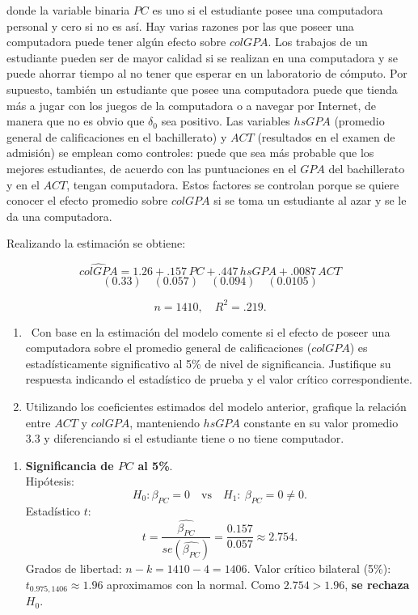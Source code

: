\documentclass[10pt,a4paper]{article}
\begin{document}
\begin{enumerate}
donde la variable binaria $PC$ es uno si el estudiante posee una computadora personal y cero si no es así. Hay varias razones por las que poseer una computadora puede tener algún efecto sobre $colGPA$. Los trabajos de un estudiante pueden ser de mayor calidad si se realizan en una computadora y se puede ahorrar tiempo al no tener que esperar en un laboratorio de cómputo. Por supuesto, también un estudiante que posee una computadora puede que tienda más a jugar con los juegos de la computadora o a navegar por Internet, de manera que no es obvio que $\delta_0$ sea positivo. Las variables $hsGPA$ (promedio general de calificaciones en el bachillerato) y $ACT$ (resultados en el examen de admisión) se emplean como controles: puede que sea más probable que los mejores estudiantes, de acuerdo con las puntuaciones en el $GPA$ del bachillerato y en el $ACT$, tengan computadora. Estos factores se controlan porque se quiere conocer el efecto promedio sobre $colGPA$ si se toma un estudiante al azar y se le da una computadora.

Realizando la estimación se obtiene:

\[
\widehat{colGPA} = 1.26 + .157\,PC + .447\,hsGPA + .0087\,ACT
\]
\[
(0.33)\quad (0.057)\quad (0.094)\quad (0.0105)
\]

\[
n = 1410, \quad R^2 = .219.
\]

\begin{enumerate}
    \item \ 
    Con base en la estimación del modelo
   comente si el efecto de poseer una computadora sobre el promedio general de calificaciones ($colGPA$) es estadísticamente significativo al 5\% de nivel de significancia.  
    Justifique su respuesta indicando el estadístico de prueba y el valor crítico correspondiente.

    \item 
    Utilizando los coeficientes estimados del modelo anterior, grafique la relación entre $ACT$ y $colGPA$, manteniendo $hsGPA$  constante en su valor promedio 3.3 y diferenciando si el estudiante tiene o no tiene computador.  
   
\end{enumerate}


{\color{blue}



\begin{enumerate}
\item \textbf{Significancia de \(PC\) al 5\%}. \\
Hipótesis:
\[
H_0:\beta_{PC}=0 \quad \text{vs}\quad H_1:\ \beta_{PC}=0\neq 0.
\]
Estadístico \(t\):
\[
t=\frac{\widehat{\beta_{PC}}}{se(\widehat{\beta_{PC}})}=\frac{0.157}{0.057}\approx 2.754.
\]
Grados de libertad: \(n-k=1410-4=1406\).
Valor crítico bilateral (5\%): \(t_{0.975,1406}\approx 1.96\) aproximamos con la normal.
Como \(2.754>1.96\), \textbf{se rechaza} \(H_0\). 


\end{enumerate}}
\end{enumerate}
\end{document}

